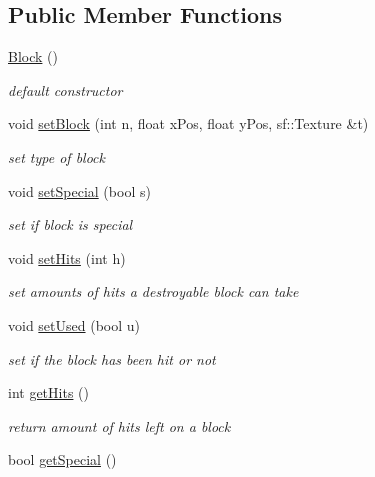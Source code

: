\subsection*{Public Member Functions}
\begin{DoxyCompactItemize}
\item 
\hypertarget{class_block_a37658a946bf5067ad01d68d9ff086adc}{\hyperlink{class_block_a37658a946bf5067ad01d68d9ff086adc}{Block} ()}\label{class_block_a37658a946bf5067ad01d68d9ff086adc}

\begin{DoxyCompactList}\small\item\em default constructor \end{DoxyCompactList}\item 
void \hyperlink{class_block_a807c16fcd68933c3a82c4b66c967bc8c}{set\-Block} (int n, float x\-Pos, float y\-Pos, sf\-::\-Texture \&t)
\begin{DoxyCompactList}\small\item\em set type of block \end{DoxyCompactList}\item 
void \hyperlink{class_block_ab21be2cadeac40c67633643f3b04977a}{set\-Special} (bool s)
\begin{DoxyCompactList}\small\item\em set if block is special \end{DoxyCompactList}\item 
void \hyperlink{class_block_a16fe4b0dc9c8f27c28470e8344e5d83a}{set\-Hits} (int h)
\begin{DoxyCompactList}\small\item\em set amounts of hits a destroyable block can take \end{DoxyCompactList}\item 
void \hyperlink{class_block_aed9186020707930f3802e63421cc5ee0}{set\-Used} (bool u)
\begin{DoxyCompactList}\small\item\em set if the block has been hit or not \end{DoxyCompactList}\item 
\hypertarget{class_block_a53401ddc379be16706e26b32b28d2272}{int \hyperlink{class_block_a53401ddc379be16706e26b32b28d2272}{get\-Hits} ()}\label{class_block_a53401ddc379be16706e26b32b28d2272}

\begin{DoxyCompactList}\small\item\em return amount of hits left on a block \end{DoxyCompactList}\item 
\hypertarget{class_block_acdbaef798dfa2a7f65091d161bee908e}{bool \hyperlink{class_block_acdbaef798dfa2a7f65091d161bee908e}{get\-Special} ()}\label{class_block_acdbaef798dfa2a7f65091d161bee908e}


\end{DoxyCompactItemize}
